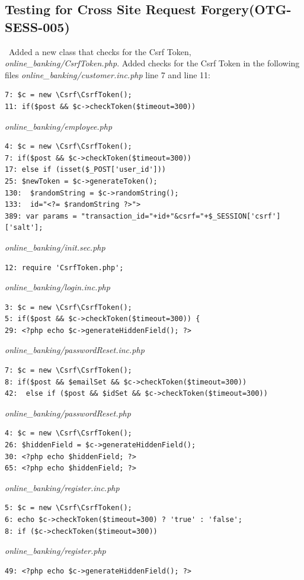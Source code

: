 \documentclass[headsepline,footsepline,footinclude=false,oneside,fontsize=11pt,paper=a4,listof=totoc,bibliography=totoc]{scrbook} %
\begin{document}
\pagebreak
\subsection{Testing for Cross Site Request Forgery(OTG-SESS-005)}\
Added a new class that checks for the Csrf Token, \textit{online\_banking/CsrfToken.php}.
Added checks for the Csrf Token in the following files \textit{online\_banking/customer.inc.php} line 7 and line 11:
\begin{lstlisting}
7: $c = new \Csrf\CsrfToken(); 
11: if($post && $c->checkToken($timeout=300))
\end{lstlisting} 
\textit{online\_banking/employee.php}
\begin{lstlisting}
4: $c = new \Csrf\CsrfToken();
7: if($post && $c->checkToken($timeout=300))
17: else if (isset($_POST['user_id'])) 
25: $newToken = $c->generateToken();
130:  $randomString = $c->randomString();
133:  id="<?= $randomString ?>">
389: var params = "transaction_id="+id+"&csrf="+$_SESSION['csrf']['salt'];
\end{lstlisting} 
\textit{online\_banking/init.sec.php}
\begin{lstlisting}
12: require 'CsrfToken.php';
\end{lstlisting} 
\textit{online\_banking/login.inc.php}
\begin{lstlisting}
3: $c = new \Csrf\CsrfToken();
5: if($post && $c->checkToken($timeout=300)) {
29: <?php echo $c->generateHiddenField(); ?>
\end{lstlisting} 
\textit{online\_banking/passwordReset.inc.php}
\begin{lstlisting}
7: $c = new \Csrf\CsrfToken();
8: if($post && $emailSet && $c->checkToken($timeout=300)) 
42:  else if ($post && $idSet && $c->checkToken($timeout=300))
\end{lstlisting}
\textit{online\_banking/passwordReset.php}
\begin{lstlisting}
4: $c = new \Csrf\CsrfToken();
26: $hiddenField = $c->generateHiddenField();
30: <?php echo $hiddenField; ?>
65: <?php echo $hiddenField; ?>
\end{lstlisting}
\textit{online\_banking/register.inc.php}
\begin{lstlisting}
5: $c = new \Csrf\CsrfToken();
6: echo $c->checkToken($timeout=300) ? 'true' : 'false';
8: if ($c->checkToken($timeout=300))

\end{lstlisting}
\textit{online\_banking/register.php}
\begin{lstlisting} 
49: <?php echo $c->generateHiddenField(); ?>
\end{lstlisting}
\end{document}

